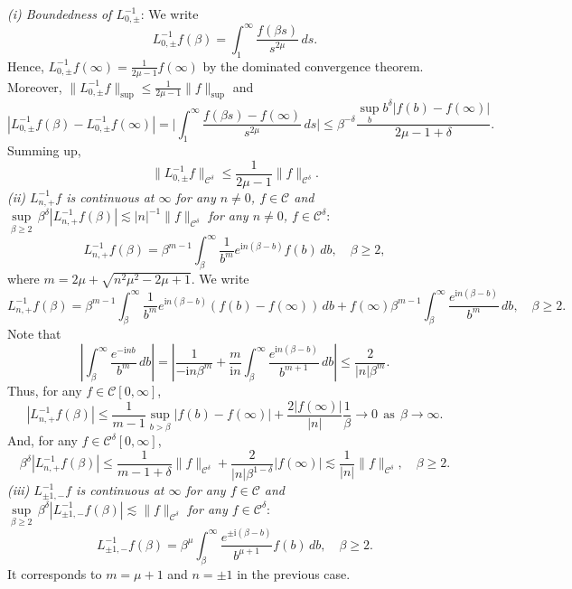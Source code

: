 \documentclass[11pt]{article}
\makeatletter
\renewenvironment{proof}[1][\proofname]{\par
  \vspace{-.7\topsep}%
  \pushQED{\qed}%
  \normalfont
  \topsep0pt \partopsep0pt %
  \trivlist
  \item[\hskip\labelsep
        \itshape
    #1\@addpunct{.}]\ignorespaces
}{%
  \popQED\endtrivlist\@endpefalse
  \addvspace{6pt plus 6pt} %
}
\theoremstyle{definition}
\theoremstyle{remark}
\numberwithin{equation}{section}
\newcommand{\mcal}{\mathcal}
\newcommand{\abs}[1]{\left\lvert #1 \right\rvert}
\newcommand{\norm}[1]{\lVert #1 \rVert}
\makeatother
\begin{document}
\begin{proof}
\textit{(i) Boundedness of $L_{0,\pm}^{-1}$}: We write
\[L_{0,\pm}^{-1} f(\beta) = \int_1^\infty \frac{f(\beta s)}{s^{2\mu}} \,ds.\]
Hence, $L_{0,\pm}^{-1} f(\infty) = \frac{1}{2\mu-1} f(\infty)$ by the dominated convergence theorem. Moreover, $\norm{L_{0,\pm}^{-1} f}_{\sup} \leq \frac{1}{2\mu-1} \norm{f}_{\sup}$ and
\[|L_{0,\pm}^{-1} f(\beta) - L_{0,\pm}^{-1} f(\infty)| = \bigg|\int_1^\infty \frac{f(\beta s) - f(\infty)}{s^{2\mu}} \,ds \bigg| \leq \beta^{-\delta} \frac{\sup_{b} b^\delta |f(b) - f(\infty)| }{2\mu -1+ \delta}.\]
Summing up,
\[\norm{L_{0,\pm}^{-1} f}_{\mcal{C}^\delta} \leq \frac{1}{2\mu - 1} \norm{f}_{\mcal{C}^\delta}.\]
\textit{(ii) $L_{n,+}^{-1} f$ is continuous at $\infty$ for any $n\neq 0$, $f\in \mcal{C}$ and $\underset{\beta \geq 2}{\sup} \,\beta^\delta |L_{n,+}^{-1} f(\beta)| \lesssim |n|^{-1} \norm{f}_{\mcal{C}^\delta}$ for any $n\neq 0$, $f\in\mcal{C}^\delta$}:
\[L_{n,+}^{-1} f(\beta) = \beta^{m - 1} \int_\beta^\infty \frac{1}{b^{m}} e^{\textrm{i}n (\beta - b)} f(b) \,db, \quad \beta \geq 2,\]
where $m = 2\mu + \sqrt{n^2\mu^2 - 2\mu +1}$. We write
\[L_{n,+}^{-1} f(\beta) = \beta^{m - 1} \int_\beta^\infty \frac{1}{b^{m}} e^{\textrm{i}n (\beta - b)} (f(b) - f(\infty)) \,db + f(\infty) \beta^{m-1} \int_\beta^\infty \frac{e^{\textrm{i}n(\beta - b)}}{b^m} \,db, \quad \beta \geq 2.\]
Note that
\[\abs{\int_\beta^\infty \frac{e^{-\textrm{i}n b}}{b^m} \,db} = \abs{\frac{1}{-\textrm{i}n \beta^m} + \frac{m}{\textrm{i}n} \int_\beta^\infty \frac{e^{\textrm{i}n (\beta - b)}}{b^{m+1}} \,db} \leq \frac{2}{|n| \beta^{m}}.\]
Thus, for any $f\in \mcal{C}[0,\infty]$,
\[|L_{n,+}^{-1} f(\beta)| \leq \frac{1}{m-1} \sup_{b>\beta} |f(b) - f(\infty)| + \frac{2|f(\infty)|}{|n|} \frac{1}{\beta} \to 0~~\text{as}~~\beta\to\infty.\]
And, for any $f\in \mcal{C}^\delta[0,\infty]$,
\[\beta^\delta |L_{n,+}^{-1} f(\beta)| \leq \frac{1}{m-1 + \delta} \norm{f}_{\mcal{C}^\delta} + \frac{2}{|n| \beta^{1 - \delta}} |f(\infty)| \lesssim \frac{1}{|n|} \norm{f}_{\mcal{C}^\delta}, \quad \beta \geq 2.\]
\textit{(iii) $L_{\pm 1,-}^{-1} f$ is continuous at $\infty$ for any $f\in \mcal{C}$ and $\underset{\beta \geq 2}{\sup} \,\beta^\delta |L_{\pm 1,-}^{-1} f(\beta)| \lesssim  \norm{f}_{\mcal{C}^\delta}$ for any $f\in \mcal{C}^\delta$}:
\[L_{\pm 1, -}^{-1} f(\beta) = \beta^\mu \int_\beta^\infty \frac{e^{\pm \textrm{i}(\beta - b)}}{b^{\mu + 1}} f(b) \,db, \quad \beta \geq 2.\]
It corresponds to $m = \mu + 1$ and $n = \pm 1$ in the previous case.


\end{proof}
\end{document}
